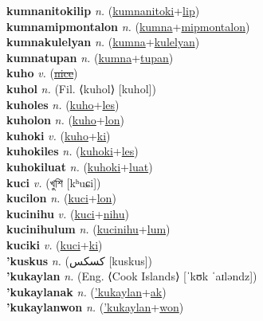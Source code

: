 \textbf{kumnanitokilip} \textit{n.} (\hyperref[kumnanitoki]{kumnanitoki}+\hyperref[lip]{lip})
 \label{kumnanitokilip} \\
\textbf{kumnamipmontalon} \textit{n.} (\hyperref[kumna]{kumna}+\hyperref[mipmontalon]{mipmontalon})
 \label{kumnamipmontalon} \\
\textbf{kumnakulelyan} \textit{n.} (\hyperref[kumna]{kumna}+\hyperref[kulelyan]{kulelyan})
 \label{kumnakulelyan} \\
\textbf{kumnatupan} \textit{n.} (\hyperref[kumna]{kumna}+\hyperref[tupan]{tupan})
 \label{kumnatupan} \\
\textbf{kuho} \textit{v.} (\hyperref[nice]{\sout{nice}})
 \label{kuho} \\
\textbf{kuhol} \textit{n.} (Fil. ⟨kuhol⟩ [kuhol])
 \label{kuhol} \\
\textbf{kuholes} \textit{n.} (\hyperref[kuho]{kuho}+\hyperref[les]{les})
 \label{kuholes} \\
\textbf{kuholon} \textit{n.} (\hyperref[kuho]{kuho}+\hyperref[lon]{lon})
 \label{kuholon} \\
\textbf{kuhoki} \textit{v.} (\hyperref[kuho]{kuho}+\hyperref[ki]{ki})
 \label{kuhoki} \\
\textbf{kuhokiles} \textit{n.} (\hyperref[kuhoki]{kuhoki}+\hyperref[les]{les})
 \label{kuhokiles} \\
\textbf{kuhokiluat} \textit{n.} (\hyperref[kuhoki]{kuhoki}+\hyperref[luat]{luat})
 \label{kuhokiluat} \\
\textbf{kuci} \textit{v.} ({\bengali{}খুশি} [kʰuɕi])
 \label{kuci} \\
\textbf{kucilon} \textit{n.} (\hyperref[kuci]{kuci}+\hyperref[lon]{lon})
 \label{kucilon} \\
\textbf{kucinihu} \textit{v.} (\hyperref[kuci]{kuci}+\hyperref[nihu]{nihu})
 \label{kucinihu} \\
\textbf{kucinihulum} \textit{n.} (\hyperref[kucinihu]{kucinihu}+\hyperref[lum]{lum})
 \label{kucinihulum} \\
\textbf{kuciki} \textit{v.} (\hyperref[kuci]{kuci}+\hyperref[ki]{ki})
 \label{kuciki} \\
\textbf{'kuskus} \textit{n.} ({\arabics{}كسكس} [kuskus])
 \label{'kuskus} \\
\textbf{'kukaylan} \textit{n.} (Eng. ⟨Cook Islands⟩ [ˈkʊk ˈaɪləndz])
 \label{'kukaylan} \\
\textbf{'kukaylanak} \textit{n.} (\hyperref['kukaylan]{'kukaylan}+\hyperref[ak]{ak})
 \label{'kukaylanak} \\
\textbf{'kukaylanwon} \textit{n.} (\hyperref['kukaylan]{'kukaylan}+\hyperref[won]{won})
